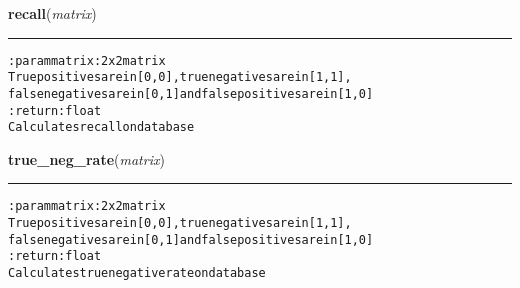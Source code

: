     \label{hal:ml:utils:matrix:recall}

    \vspace{0.5ex}

\hspace{.8\funcindent}\begin{boxedminipage}{\funcwidth}

    \raggedright \textbf{recall}(\textit{matrix})

    \vspace{-1.5ex}

    \rule{\textwidth}{0.5\fboxrule}
\setlength{\parskip}{2ex}
\begin{alltt}

:param matrix: 2 x 2 matrix
    True positives are in [0,0], true negatives are in [1,1],
    false negatives are in [0,1] and false positives are in [1,0]
:return: float
    Calculates recall on database
\end{alltt}

\setlength{\parskip}{1ex}
    \end{boxedminipage}

    \label{hal:ml:utils:matrix:true_neg_rate}

    \vspace{0.5ex}

\hspace{.8\funcindent}\begin{boxedminipage}{\funcwidth}

    \raggedright \textbf{true\_neg\_rate}(\textit{matrix})

    \vspace{-1.5ex}

    \rule{\textwidth}{0.5\fboxrule}
\setlength{\parskip}{2ex}
\begin{alltt}

:param matrix: 2 x 2 matrix
    True positives are in [0,0], true negatives are in [1,1],
    false negatives are in [0,1] and false positives are in [1,0]
:return: float
    Calculates true negative rate on database
\end{alltt}

\setlength{\parskip}{1ex}
    \end{boxedminipage}

